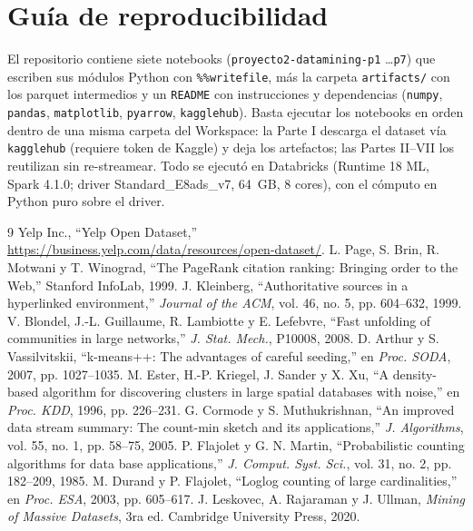 \documentclass[conference]{IEEEtran}
\begin{document}
\appendices
\section{Guía de reproducibilidad}
El repositorio contiene siete notebooks (\texttt{proyecto2-datamining-p1} \ldots \texttt{p7}) que escriben sus módulos Python con \texttt{\%\%writefile}, más la carpeta \texttt{artifacts/} con los parquet intermedios y un \texttt{README} con instrucciones y dependencias (\texttt{numpy}, \texttt{pandas}, \texttt{matplotlib}, \texttt{pyarrow}, \texttt{kagglehub}). Basta ejecutar los notebooks en orden dentro de una misma carpeta del Workspace: la Parte I descarga el dataset vía \texttt{kagglehub} (requiere token de Kaggle) y deja los artefactos; las Partes II--VII los reutilizan sin re-streamear. Todo se ejecutó en Databricks (Runtime 18 ML, Spark 4.1.0; driver Standard\_E8ads\_v7, 64~GB, 8 cores), con el cómputo en Python puro sobre el driver.

\begin{thebibliography}{9}
 Yelp Inc., ``Yelp Open Dataset,'' \url{https://business.yelp.com/data/resources/open-dataset/}.
 L. Page, S. Brin, R. Motwani y T. Winograd, ``The PageRank citation ranking: Bringing order to the Web,'' Stanford InfoLab, 1999.
 J. Kleinberg, ``Authoritative sources in a hyperlinked environment,'' \emph{Journal of the ACM}, vol. 46, no. 5, pp. 604--632, 1999.
 V. Blondel, J.-L. Guillaume, R. Lambiotte y E. Lefebvre, ``Fast unfolding of communities in large networks,'' \emph{J. Stat. Mech.}, P10008, 2008.
 D. Arthur y S. Vassilvitskii, ``k-means++: The advantages of careful seeding,'' en \emph{Proc. SODA}, 2007, pp. 1027--1035.
 M. Ester, H.-P. Kriegel, J. Sander y X. Xu, ``A density-based algorithm for discovering clusters in large spatial databases with noise,'' en \emph{Proc. KDD}, 1996, pp. 226--231.
 G. Cormode y S. Muthukrishnan, ``An improved data stream summary: The count-min sketch and its applications,'' \emph{J. Algorithms}, vol. 55, no. 1, pp. 58--75, 2005.
 P. Flajolet y G. N. Martin, ``Probabilistic counting algorithms for data base applications,'' \emph{J. Comput. Syst. Sci.}, vol. 31, no. 2, pp. 182--209, 1985.
 M. Durand y P. Flajolet, ``Loglog counting of large cardinalities,'' en \emph{Proc. ESA}, 2003, pp. 605--617.
 J. Leskovec, A. Rajaraman y J. Ullman, \emph{Mining of Massive Datasets}, 3ra ed. Cambridge University Press, 2020.
\end{thebibliography}
\end{document}
